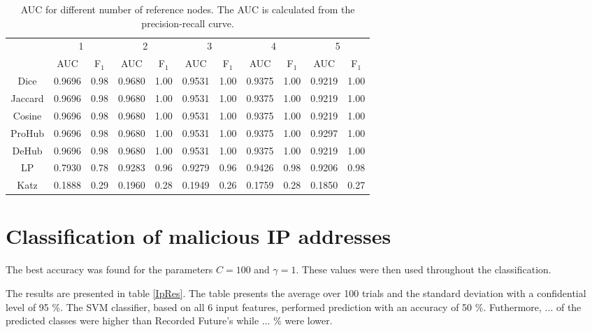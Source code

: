 \begin{table}[h!]
    \centering
    \caption{AUC for different number of reference nodes. The AUC is calculated from the precision-recall curve.}
    \begin{tabular}{|c||c|c||c|c||c|c||c|c||c|c|}
      \hline
      \multirow{2}{*}{~} 
            & \multicolumn{2}{c||}{1}
            & \multicolumn{2}{c||}{2}
            & \multicolumn{2}{c||}{3}
            & \multicolumn{2}{c||}{4}
            & \multicolumn{2}{|c|}{5} \\             \cline{2-11}
      ~     &AUC&F$_1$&AUC&F$_1$&AUC&F$_1$&AUC&F$_1$&AUC&F$_1$ \\ \hline
    Dice    & 0.9696 & 0.98 & 0.9680 & 1.00 & 0.9531 & 1.00 & 0.9375 & 1.00 & 0.9219 & 1.00 \\
    Jaccard & 0.9696 & 0.98 & 0.9680 & 1.00 & 0.9531 & 1.00 & 0.9375 & 1.00 & 0.9219 & 1.00 \\
    Cosine  & 0.9696 & 0.98 & 0.9680 & 1.00 & 0.9531 & 1.00 & 0.9375 & 1.00 & 0.9219 & 1.00 \\
    ProHub  & 0.9696 & 0.98 & 0.9680 & 1.00 & 0.9531 & 1.00 & 0.9375 & 1.00 & 0.9297 & 1.00 \\
    DeHub   & 0.9696 & 0.98 & 0.9680 & 1.00 & 0.9531 & 1.00 & 0.9375 & 1.00 & 0.9219 & 1.00 \\ 
    LP      & 0.7930 & 0.78 & 0.9283 & 0.96 & 0.9279 & 0.96 & 0.9426 & 0.98 & 0.9206 & 0.98 \\ 
    Katz    & 0.1888 & 0.29 & 0.1960 & 0.28 & 0.1949 & 0.26 & 0.1759 & 0.28 & 0.1850 & 0.27 \\ \hline
    \end{tabular}
    \label{aucIndex2}
\end{table}




\section{Classification of malicious IP addresses}

The best accuracy was found for the parameters $C=100$ and $\gamma=1$. These values were then used throughout the classification. 

The results are presented in table \ref{IpRes}. The table presents the average over 100 trials and the standard deviation with a confidential level of 95 \%. The SVM classifier, based on all 6 input features, performed prediction with an accuracy of 50 \%. Futhermore, ... of the predicted classes were higher than Recorded Future's while ... \% were lower. 

